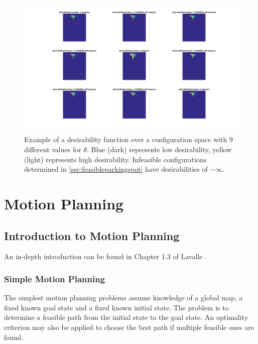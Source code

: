 \begin{figure}
\centering
\includegraphics[width=6in]{figures/desirabilityfunction.png}
\caption{Example of a desirability function over a configuration space with 9
different values for $\theta$. Blue (dark) represents low desirability, yellow
(light) represents high desirability. Infeasible configurations determined in 
\autoref{sec:feasibleparkingspot} have desirabilities of $-\infty$.} 
\label{fig:desirabilityfunction}
\end{figure}
\chapter{Motion Planning}
\section{Introduction to Motion Planning}
An in-depth introduction can be found in Chapter 1.3 of Lavalle
\cite{lavalle2006planning}.

\subsection{Simple Motion Planning}
The simplest motion planning problems assume knowledge of a global map, a fixed
known goal state and a fixed known initial state. The problem is to determine a
feasible path from the initial state to the goal state. An optimality criterion
may also be applied to choose the best path if multiple feasible ones are found.


